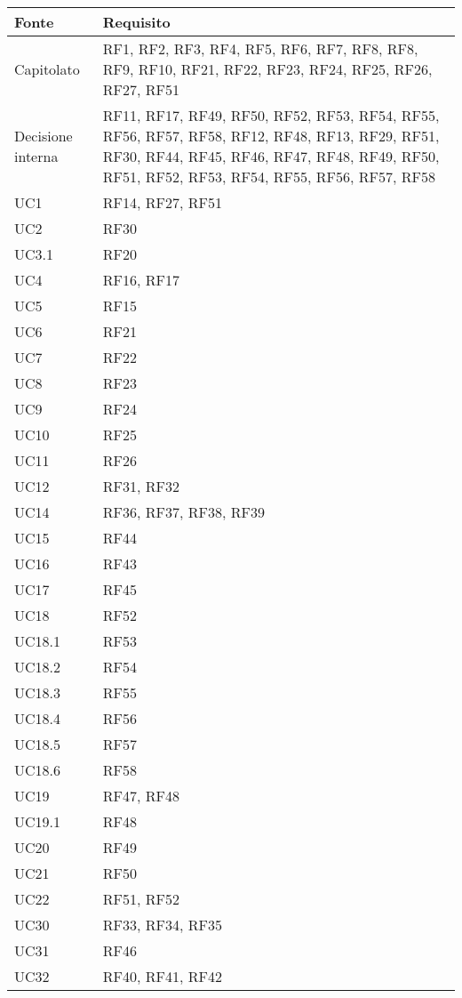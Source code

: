 \begin{center}
  \begin{longtable}{|C{5cm}|C{5cm}|}
    \hline
    \textbf{Fonte} & \textbf{Requisito} \\
    \hline
    Capitolato & RF1, RF2, RF3, RF4, RF5, RF6, RF7, RF8, RF8, RF9, RF10, RF21, RF22, RF23, RF24, RF25, RF26, RF27, RF51 \\
    \hline
    Decisione interna & RF11, RF17, RF49, RF50, RF52, RF53, RF54, RF55, RF56, RF57, RF58, RF12, RF48, RF13, RF29, RF51, RF30, RF44, RF45, RF46, RF47, RF48, RF49, RF50, RF51, RF52, RF53, RF54, RF55, RF56, RF57, RF58 \\
    \hline
    UC1 & RF14, RF27, RF51 \\
    \hline
    UC2 & RF30 \\
    \hline
    UC3.1 & RF20 \\
    \hline
    UC4 & RF16, RF17 \\
    \hline
    UC5 & RF15 \\
    \hline
    UC6 & RF21 \\
    \hline
    UC7 & RF22 \\
    \hline
    UC8 & RF23 \\
    \hline
    UC9 & RF24 \\
    \hline
    UC10 & RF25 \\
    \hline
    UC11 & RF26 \\
    \hline
    UC12 & RF31, RF32 \\
    \hline
    UC14 & RF36, RF37, RF38, RF39 \\
    \hline
    UC15 & RF44 \\
    \hline
    UC16 & RF43 \\
    \hline
    UC17 & RF45 \\
    \hline
    UC18 & RF52 \\
    \hline
    UC18.1 & RF53 \\
    \hline
    UC18.2 & RF54 \\
    \hline
    UC18.3 & RF55 \\
    \hline
    UC18.4 & RF56 \\
    \hline
    UC18.5 & RF57 \\
    \hline
    UC18.6 & RF58 \\
    \hline
    UC19 & RF47, RF48 \\
    \hline
    UC19.1 & RF48 \\
    \hline
    UC20 & RF49 \\
    \hline
    UC21 & RF50 \\
    \hline
    UC22 & RF51, RF52 \\
    \hline
    UC30 & RF33, RF34, RF35 \\
    \hline
    UC31 & RF46 \\
    \hline
    UC32 & RF40, RF41, RF42 \\
    \hline
\end{longtable}
\end{center}
